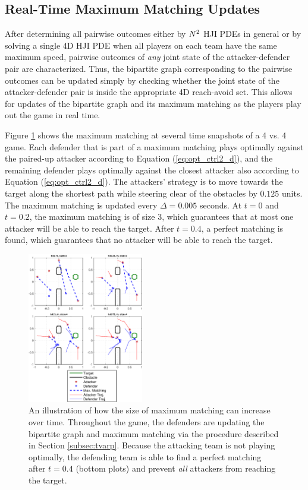 \subsection{Real-Time Maximum Matching Updates}
After determining all pairwise outcomes either by $N^2$ HJI PDEs in general or by solving a single 4D HJI PDE when all players on each team have the same maximum speed, pairwise outcomes of \textit{any} joint state of the attacker-defender pair are characterized. Thus, the bipartite graph corresponding to the pairwise outcomes can be updated simply by checking whether the joint state of the attacker-defender pair is inside the appropriate 4D reach-avoid set. This allows for updates of the bipartite graph and its maximum matching as the players play out the game in real time.

Figure \ref{fig:real_time_update} shows the maximum matching at several time snapshots of a 4 vs. 4 game. Each defender that is part of a maximum matching plays optimally against the paired-up attacker according to Equation (\ref{eq:opt_ctrl2_d}), and the remaining defender plays optimally against the closest attacker also according to Equation (\ref{eq:opt_ctrl2_d}). The attackers' strategy is to move towards the target along the shortest path while steering clear of the obstacles by $0.125$ units. The maximum matching is updated every $\Delta=0.005$ seconds. At $t=0$ and $t=0.2$, the maximum matching is of size 3, which guarantees that at most one attacker will be able to reach the target. After $t=0.4$, a perfect matching is found, which guarantees that no attacker will be able to reach the target.

\begin{figure}
	\centering
	\includegraphics[width=0.45\textwidth]{"fig/time varying graph"}
	\caption{An illustration of how the size of maximum matching can increase over time. Throughout the game, the defenders are updating the bipartite graph and maximum matching via the procedure described in Section \ref{subsec:tvarp}. Because the attacking team is not playing optimally, the defending team is able to find a perfect matching after $t=0.4$ (bottom plots) and prevent \textit{all} attackers from reaching the target.}
	\label{fig:real_time_update}
\end{figure}
